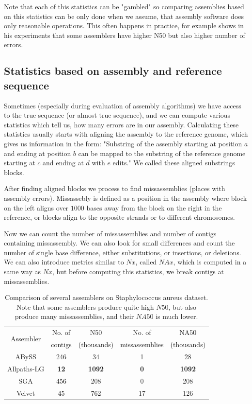 Note that each of this statistics can be "gambled" so comparing assemblies based
on this statistics can be only done when we assume, that assembly software does only
reasonable operations. This often happens in practice, for example
\citet{gage} shows in his experiments that some assemblers have
higher N50 but also higher number of errors. 

\subsection{Statistics based on assembly and reference sequence}

Sometimes (especially during evaluation of assembly algorithms) we have access to 
the true sequence
(or almost true sequence), and we can compute various statistics which tell us, how many
errors are in our assembly.
Calculating these statistics usually starts with aligning the assembly to the
reference genome, which
gives us information in the form:
"Substring of the assembly starting at position $a$ and ending at position $b$ can be mapped
to the substring of the reference genome starting at $c$ and ending at $d$ with $e$ edits."
We called these aligned substrings blocks. 

After finding aligned blocks we process to find missassemblies (places with assembly errors).
Missassebly \citep{Quast} is defined as a position in the assembly where block on the left
aligns over $1000$ bases away from the block on the right in the reference,
or blocks align to the opposite strands or to different chromosomes.

Now we can count the number of missassemblies and number of contigs containing missassembly.
We can also look for small differences and count the number of single base difference, either
substitutions, or insertions, or deletions. 
We can also introduce metrics similar to $Nx$, called $NAx$, which is computed in a same way
as $Nx$, but before computing this statistics, we break contigs at missassemblies.

\begin{table}
\centering
\begin{tabular}{|c|c|c|c|c|}
\hline
\multirow{2}{*}{Assembler} & No. of  & N50        & No. of         & NA50  \\
                           & contigs & (thousands)& missassemblies & (thousands) \\\hline
ABySS & 246 & 34 & 1 & 28 \\\hline
Allpaths-LG & {\bf 12} & {\bf 1092} & {\bf 0} & {\bf 1092} \\\hline
SGA & 456 & 208 & 0 & 208 \\\hline
Velvet & 45 & 762 & 17 & 126 \\\hline
\end{tabular}
\caption{Comparison of several assemblers on Staphylococcus aureus dataset. Note that some
  assemblers produce quite high $N50$, but also produce many missassemblies, and their
$NA50$ is much lower.} 
\label{tab:gage}
\end{table}


